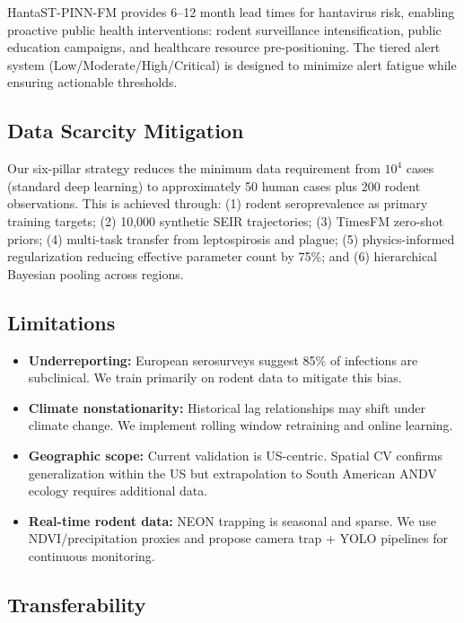 \documentclass[11pt,a4paper]{article}
\begin{document}
HantaST-PINN-FM provides 6--12 month lead times for hantavirus risk, enabling proactive public health interventions: rodent surveillance intensification, public education campaigns, and healthcare resource pre-positioning. The tiered alert system (Low/Moderate/High/Critical) is designed to minimize alert fatigue while ensuring actionable thresholds.

\subsection{Data Scarcity Mitigation}

Our six-pillar strategy reduces the minimum data requirement from $10^4$ cases (standard deep learning) to approximately 50 human cases plus 200 rodent observations. This is achieved through: (1) rodent seroprevalence as primary training targets; (2) 10,000 synthetic SEIR trajectories; (3) TimesFM zero-shot priors; (4) multi-task transfer from leptospirosis and plague; (5) physics-informed regularization reducing effective parameter count by 75\%; and (6) hierarchical Bayesian pooling across regions.

\subsection{Limitations}

\begin{itemize}
    \item \textbf{Underreporting:} European serosurveys suggest 85\% of infections are subclinical. We train primarily on rodent data to mitigate this bias.
    \item \textbf{Climate nonstationarity:} Historical lag relationships may shift under climate change. We implement rolling window retraining and online learning.
    \item \textbf{Geographic scope:} Current validation is US-centric. Spatial CV confirms generalization within the US but extrapolation to South American ANDV ecology requires additional data.
    \item \textbf{Real-time rodent data:} NEON trapping is seasonal and sparse. We use NDVI/precipitation proxies and propose camera trap + YOLO pipelines for continuous monitoring.
\end{itemize}

\subsection{Transferability}
\end{document}
